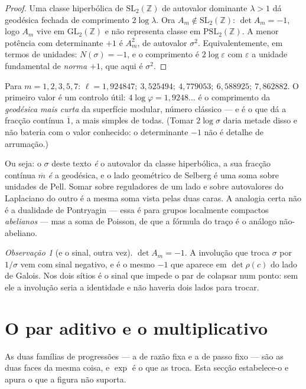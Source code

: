 \documentclass[11pt,a4paper]{article}
\theoremstyle{plain}
\theoremstyle{definition}
\theoremstyle{remark}
\newtheorem{obs}[teorema]{Observação}
\newcommand{\Z}{\mathbb{Z}}
\newcommand{\GL}{\mathrm{GL}}
\newcommand{\PSL}{\mathrm{PSL}}
\newcommand{\SL}{\mathrm{SL}}
\begin{document}
\begin{proof}
Uma classe hiperbólica de $\SL_2(\Z)$ de autovalor dominante $\lambda>1$ dá geodésica fechada de
comprimento $2\log\lambda$. Ora $A_m \notin \SL_2(\Z)$: $\det A_m = -1$, logo $A_m$ vive em
$\GL_2(\Z)$ e não representa classe em $\PSL_2(\Z)$. A menor potência com determinante $+1$ é
$A_m^2$, de autovalor $\sigma^2$. Equivalentemente, em termos de unidades: $N(\sigma) = -1$, e o
comprimento é $2\log\varepsilon$ com $\varepsilon$ a unidade fundamental de \emph{norma $+1$}, que
aqui é $\sigma^2$.
\end{proof}

\noindent Para $m=1,2,3,5,7$: $\ell = 1{,}924847;\ 3{,}525494;\ 4{,}779053;\ 6{,}588925;\
7{,}862882$. O primeiro valor é um controlo útil: $4\log\varphi = 1{,}9248\ldots$ é o comprimento
da \emph{geodésica mais curta} da superfície modular, número clássico --- e é o que dá a fracção
contínua $\overline{1}$, a mais simples de todas. (Tomar $2\log\sigma$ daria metade disso e não
bateria com o valor conhecido: o determinante $-1$ não é detalhe de arrumação.)

Ou seja: o $\sigma$ deste texto \emph{é} o autovalor da classe hiperbólica, a sua fracção contínua
$\overline{m}$ \emph{é} a geodésica, e o lado geométrico de Selberg é uma soma sobre unidades de
Pell. Somar sobre reguladores de um lado e sobre autovalores do Laplaciano do outro é a mesma soma
vista pelas duas caras. A analogia certa não é a dualidade de Pontryagin --- essa é para grupos
localmente compactos \emph{abelianos} --- mas a soma de Poisson, de que a fórmula do traço é o
análogo não-abeliano.

\begin{obs}[e o sinal, outra vez]
$\det A_m = -1$. A involução que troca $\sigma$ por $1/\sigma$ vem com sinal negativo, e é o mesmo
$-1$ que aparece em $\det\rho(c)$ do lado de Galois. Nos dois sítios é o sinal que impede o par de
colapsar num ponto: sem ele a involução seria a identidade e não haveria dois lados para trocar.
\end{obs}


\section{O par aditivo e o multiplicativo}\label{sec:aditmult}

As duas famílias de progressões --- a de razão fixa e a de passo fixo --- são as duas faces
da mesma coisa, e $\exp$ é o que as troca. Esta secção estabelece-o e apura o que a figura
não suporta.
\end{document}
